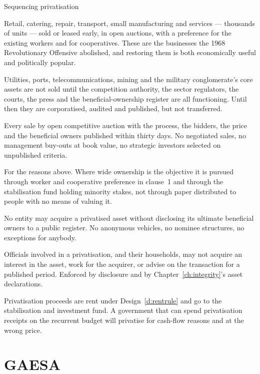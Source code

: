 \begin{design}{Sequencing privatisation}
\label{d:privat}
\begin{rules}
 Retail, catering, repair, transport, small
manufacturing and services --- thousands of units --- sold or leased early, in
open auctions, with a preference for the existing workers and for cooperatives.
These are the businesses the 1968 Revolutionary Offensive abolished, and
restoring them is both economically useful and politically popular.

 Utilities, ports, telecommunications, mining and the
military conglomerate's core assets are not sold until the competition authority,
the sector regulators, the courts, the press and the beneficial-ownership
register are all functioning. Until then they are corporatised, audited and
published, but not transferred.

 Every sale by open competitive auction with the
process, the bidders, the price and the beneficial owners published within thirty
days. No negotiated sales, no management buy-outs at book value, no strategic
investors selected on unpublished criteria.

 For the reasons above. Where wide ownership is the objective
it is pursued through worker and cooperative preference in clause~1 and through
the stabilisation fund holding minority stakes, not through paper distributed to
people with no means of valuing it.

 No entity may acquire a privatised asset without
disclosing its ultimate beneficial owners to a public register. No anonymous
vehicles, no nominee structures, no exceptions for anybody.

 Officials involved in a privatisation, and their households,
may not acquire an interest in the asset, work for the acquirer, or advise on the
transaction for a published period. Enforced by disclosure and by
Chapter~\ref{ch:integrity}'s asset declarations.

 Privatisation proceeds are rent under
Design~\ref{d:rentrule} and go to the stabilisation and investment fund. A
government that can spend privatisation receipts on the recurrent budget will
privatise for cash-flow reasons and at the wrong price.
\end{rules}
\end{design}

\section{GAESA}

